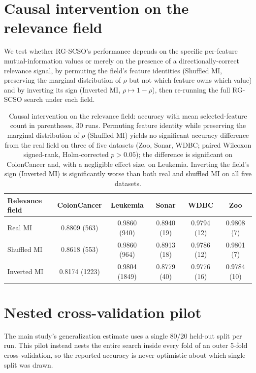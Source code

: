 \documentclass[9pt]{article}
\begin{document}
\FloatBarrier
\section{Causal intervention on the relevance field}
We test whether RG-SCSO's performance depends on the
specific per-feature mutual-information values or merely on the presence of a
directionally-correct relevance signal, by permuting the field's feature
identities (Shuffled MI, preserving the marginal distribution of $\rho$ but
not which feature owns which value) and by inverting its sign (Inverted MI,
$\rho\mapsto1-\rho$), then re-running the full RG-SCSO search under each field.

\begin{table}[t]
\centering
\caption{Causal intervention on the relevance field: accuracy with mean selected-feature count in parentheses, 30 runs. Permuting feature identity while preserving the marginal distribution of $\rho$ (Shuffled MI) yields no significant accuracy difference from the real field on three of five datasets (Zoo, Sonar, WDBC; paired Wilcoxon signed-rank, Holm-corrected $p>0.05$); the difference is significant on ColonCancer and, with a negligible effect size, on Leukemia. Inverting the field's sign (Inverted MI) is significantly worse than both real and shuffled MI on all five datasets.}
\label{tab:shufflemi}
\footnotesize
\begin{tabular}{lccccc}
\toprule
Relevance field & ColonCancer & Leukemia & Sonar & WDBC & Zoo \\
\midrule
Real MI & 0.8809 (563) & 0.9860 (940) & 0.8940 (19) & 0.9794 (12) & 0.9808 (7) \\
Shuffled MI & 0.8618 (553) & 0.9860 (964) & 0.8913 (18) & 0.9786 (12) & 0.9801 (7) \\
Inverted MI & 0.8174 (1223) & 0.9804 (1849) & 0.8779 (40) & 0.9776 (16) & 0.9784 (10) \\
\bottomrule
\end{tabular}
\end{table}


\FloatBarrier
\section{Nested cross-validation pilot}
The main study's generalization estimate uses a single
80/20 held-out split per run. This pilot instead nests the entire search
inside every fold of an outer 5-fold cross-validation, so the reported
accuracy is never optimistic about which single split was drawn.
\end{document}
